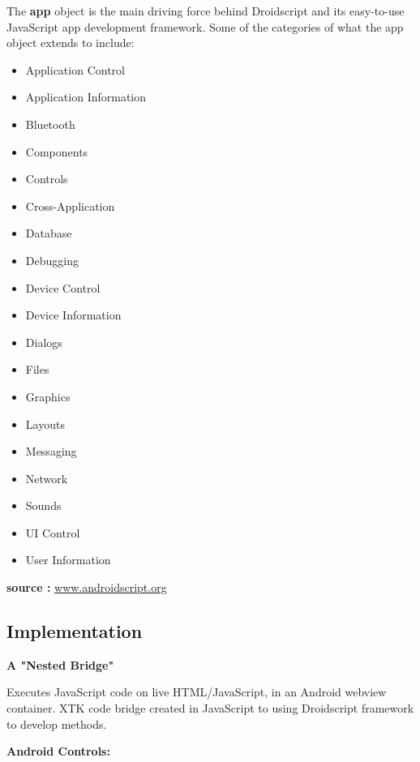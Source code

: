 \documentclass[sigconf]{acmart}
\begin{document}
    \vspace{0.09 cm}
    The \textbf{app} object is the main driving force behind Droidscript and its easy-to-use JavaScript app development framework. Some of the categories of what the app object extends to include:
    \begin{itemize}
    \item Application Control
    \item Application Information
    \item Bluetooth
    \item Components
    \item Controls
    \item Cross-Application
    \item Database
    \item Debugging
    \item Device Control
    \item Device Information
    \item Dialogs
    \item Files
    \item Graphics
    \item Layouts
    \item Messaging
    \item Network
    \item Sounds
    \item UI Control
    \item User Information
    \end{itemize}
    
    \textbf{source : }\hyperlink{www.androidscript.org}{www.androidscript.org}
    
    \subsection{Implementation}
    \textbf{A "Nested Bridge"}
    \vspace{0.09 cm}
    
    \vspace{0.18 cm}
    \newline
    Executes JavaScript code on live HTML/JavaScript, in an Android webview container. XTK code bridge created in JavaScript to using Droidscript framework to develop methods.
    \vspace{0.09 cm}
    
    \textbf{Android Controls: }
    
\end{document}
